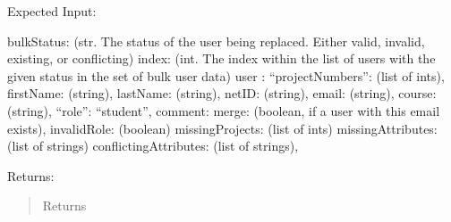 \documentclass[letterpaper,10pt,english]{sphinxmanual}
\begin{document}
\begin{fulllineitems}
\begin{fulllineitems}
Expected Input:

\begin{sphinxVerbatim}[commandchars=\\\{\}]
\PYGZob{}
    \PYGZdq{}bulkStatus\PYGZdq{}: (str. The status of the user being replaced.
        Either \PYGZdq{}valid\PYGZdq{}, \PYGZdq{}invalid\PYGZdq{}, \PYGZdq{}existing\PYGZdq{}, or \PYGZdq{}conflicting\PYGZdq{})
    \PYGZdq{}index\PYGZdq{}: (int. The index within the list of users with
        the given status in the set of bulk user data)
    \PYGZdq{}user\PYGZdq{} :  \PYGZob{}
        “projectNumbers”: (list of ints),
        \PYGZdq{}firstName\PYGZdq{}: (string),
        \PYGZdq{}lastName\PYGZdq{}: (string),
        \PYGZdq{}netID\PYGZdq{}: (string),
        \PYGZdq{}email\PYGZdq{}: (string),
        \PYGZdq{}course\PYGZdq{}: (string),
        “role”: “student”,
        \PYGZdq{}comment\PYGZdq{}: \PYGZob{}
            merge: (boolean, if a user with this email exists),
            invalidRole: (boolean)
            missingProjects: (list of ints)
            missingAttributes: (list of strings)
            conflictingAttributes: (list of strings),
        \PYGZcb{}
    \PYGZcb{}
\PYGZcb{}
\end{sphinxVerbatim}

Returns:

\begin{sphinxVerbatim}[commandchars=\\\{\}]
             
           
             
            
\end{sphinxVerbatim}
\begin{quote}\begin{description}
\item[{Returns}] \leavevmode



\end{description}
\end{quote}
\end{fulllineitems}
\end{fulllineitems}
\end{document}
